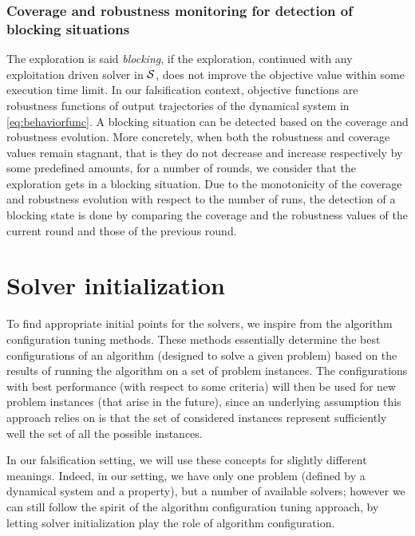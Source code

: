  

\subsubsection*{Coverage and robustness monitoring for detection of blocking situations}
The exploration is said {\em blocking}, if the exploration, continued with any exploitation driven solver in $\mathcal{S}$, does not improve the objective value within some execution time limit. In our falsification context, objective functions are robustness functions of output trajectories of the dynamical system in \ref{eq:behaviorfunc}. A blocking situation can be detected based on the coverage and robustness evolution. More concretely, when both the robustness and coverage values remain stagnant, that is they do not decrease and increase respectively by some predefined amounts, for a number of rounds, we consider that the exploration gets in a blocking situation. Due to the monotonicity of the coverage and robustness evolution with respect to the number of runs, the detection of a blocking state is done by comparing the coverage and the robustness values of the current round and those of the previous round. 


\section{Solver initialization}\label{sec:init}
To find appropriate initial points for the solvers, we inspire from the algorithm configuration tuning methods.  These methods essentially determine the best configurations of an algorithm (designed to solve a given problem) based on the results of running the algorithm on a set of problem instances. The configurations with best performance (with respect to some criteria) will then be used for new problem instances (that arise in the future), since an underlying assumption this approach relies on is that the set of considered instances represent sufficiently well the set of all the possible instances.  

In our falsification setting, we will use these concepts for slightly different meanings. Indeed, in our setting, we have only one problem (defined by a dynamical system and a property), but a number of available solvers; however we can still follow the spirit of the algorithm configuration tuning approach, by letting solver initialization play the role of algorithm configuration.


